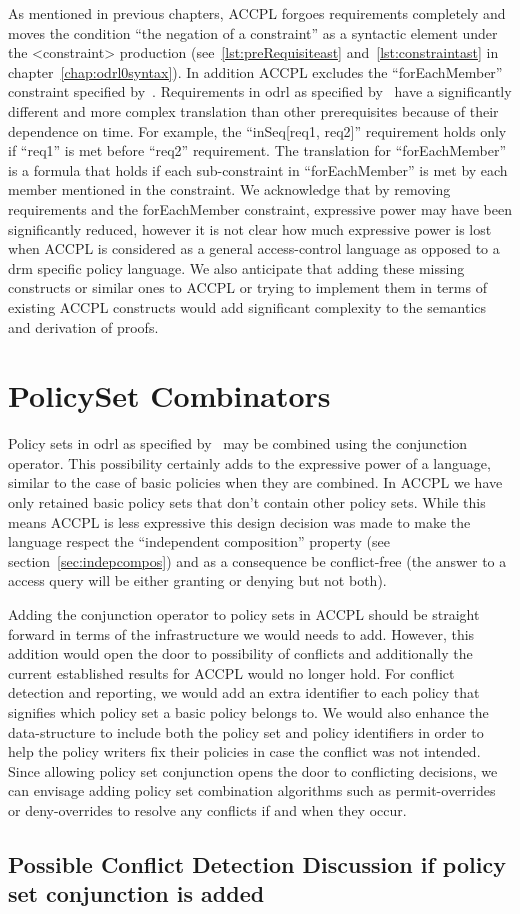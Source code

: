 As mentioned in previous chapters, \ac{ACCPL} forgoes requirements completely and moves the condition ``the negation of a constraint'' as a syntactic element under the <constraint> production (see~\ref{lst:preRequisiteast} and~\ref{lst:constraintast} in chapter~\ref{chap:odrl0syntax}). In addition \ac{ACCPL} excludes the ``forEachMember'' constraint specified by~\cite{pucella2006}. Requirements in \ac{odrl} as specified by~\cite{pucella2006} have a significantly different and more complex translation than other prerequisites because of their dependence on time. For example, the ``inSeq[req1, req2]'' requirement holds only if ``req1'' is met before ``req2'' requirement. The translation for ``forEachMember'' is a formula that holds if each sub-constraint in ``forEachMember'' is met by each member mentioned in the constraint. We acknowledge that by removing requirements and the forEachMember constraint, expressive power may have been significantly reduced, however it is not clear how much expressive power is lost when \ac{ACCPL} is considered as a general access-control language as opposed to a \ac{drm} specific policy language. We also anticipate that adding these missing constructs or similar ones to \ac{ACCPL} or trying to implement them in terms of existing \ac{ACCPL} constructs would add significant complexity to the semantics and derivation of proofs.

\section{PolicySet Combinators}  

Policy sets in \ac{odrl} as specified by~\cite{pucella2006} may be combined using the conjunction operator. This possibility certainly adds to the expressive power of a language, similar to the case of basic policies when they are combined. In \ac{ACCPL} we have only retained basic policy sets that don't contain other policy sets. While this means \ac{ACCPL} is less expressive this design decision was made to make the language respect the ``independent composition'' property (see section~\ref{sec:indepcompos}) and as a consequence be conflict-free (the answer to a access query will be either granting or denying but not both). 

Adding the conjunction operator to policy sets in \ac{ACCPL} should be straight forward in terms of the infrastructure we would needs to add. However, this addition would open the door to possibility of conflicts and additionally the current established results for \ac{ACCPL} would no longer hold. For conflict detection and reporting, we would add an extra identifier to each policy that signifies which policy set a basic policy belongs to. We would also enhance the  data-structure to include both the policy set and policy identifiers in order to help the policy writers fix their policies in case the conflict was not intended. Since allowing policy set conjunction opens the door to conflicting decisions, we can envisage adding policy set combination algorithms such as permit-overrides or deny-overrides to resolve any conflicts if and when they occur. 

\subsection{Possible Conflict Detection Discussion if policy set conjunction is added}  
